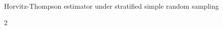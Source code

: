 \begin{frame}{\vskip -0.5cm \large Horvitz-Thompson estimator under stratified simple random sampling}
\begin{multicols}{2}
\begin{flushright}
\begin{minipage}{6.5cm}
\begin{eqnarray*}
	\end{eqnarray*}
	\end{minipage}
	\end{flushright}

\end{multicols}

\end{frame}
\normalsize

